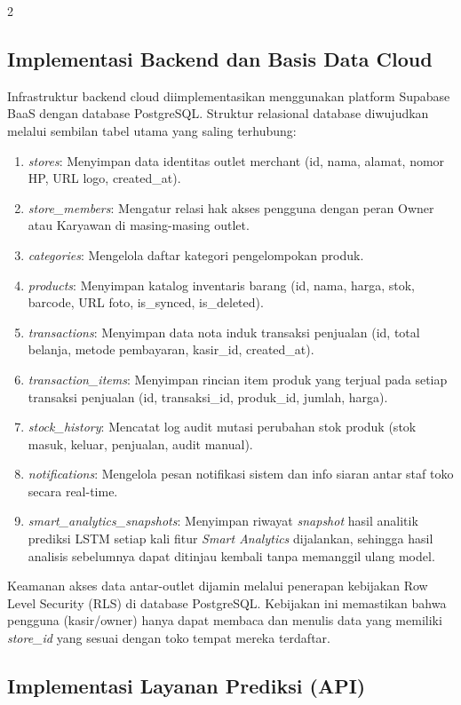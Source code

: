 \documentclass[12pt, a4paper, onecolumn, oneside]{report}
\begin{document}
\begin{spacing}{2}
\subsection{Implementasi Backend dan Basis Data Cloud}

Infrastruktur backend cloud diimplementasikan menggunakan platform Supabase BaaS dengan database PostgreSQL. Struktur relasional database diwujudkan melalui sembilan tabel utama yang saling terhubung:
\begin{enumerate}
    \item \textit{stores}: Menyimpan data identitas outlet merchant (id, nama, alamat, nomor HP, URL logo, created\_at).
    \item \textit{store\_members}: Mengatur relasi hak akses pengguna dengan peran Owner atau Karyawan di masing-masing outlet.
    \item \textit{categories}: Mengelola daftar kategori pengelompokan produk.
    \item \textit{products}: Menyimpan katalog inventaris barang (id, nama, harga, stok, barcode, URL foto, is\_synced, is\_deleted).
    \item \textit{transactions}: Menyimpan data nota induk transaksi penjualan (id, total belanja, metode pembayaran, kasir\_id, created\_at).
    \item \textit{transaction\_items}: Menyimpan rincian item produk yang terjual pada setiap transaksi penjualan (id, transaksi\_id, produk\_id, jumlah, harga).
    \item \textit{stock\_history}: Mencatat log audit mutasi perubahan stok produk (stok masuk, keluar, penjualan, audit manual).
    \item \textit{notifications}: Mengelola pesan notifikasi sistem dan info siaran antar staf toko secara real-time.
    \item \textit{smart\_analytics\_snapshots}: Menyimpan riwayat \textit{snapshot} hasil analitik prediksi LSTM setiap kali fitur \textit{Smart Analytics} dijalankan, sehingga hasil analisis sebelumnya dapat ditinjau kembali tanpa memanggil ulang model.
\end{enumerate}

Keamanan akses data antar-outlet dijamin melalui penerapan kebijakan Row Level Security (RLS) di database PostgreSQL. Kebijakan ini memastikan bahwa pengguna (kasir/owner) hanya dapat membaca dan menulis data yang memiliki \textit{store\_id} yang sesuai dengan toko tempat mereka terdaftar.

\subsection{Implementasi Layanan Prediksi (API)}


\end{spacing}
\end{document}
